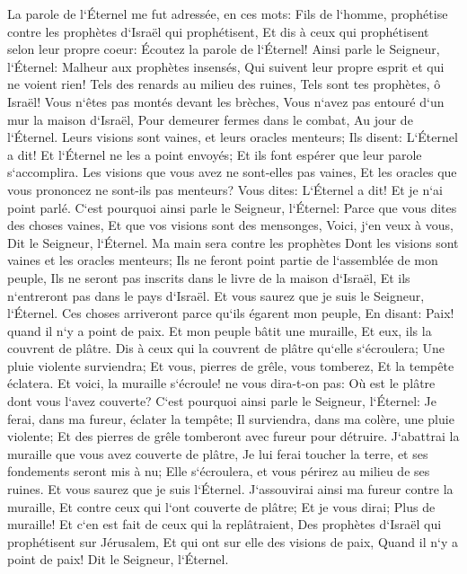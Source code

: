 \verse La parole de l`Éternel me fut adressée, en ces mots: 
\verse Fils de l`homme, prophétise contre les prophètes d`Israël qui prophétisent, Et dis à ceux qui prophétisent selon leur propre coeur: Écoutez la parole de l`Éternel! 
\verse Ainsi parle le Seigneur, l`Éternel: Malheur aux prophètes insensés, Qui suivent leur propre esprit et qui ne voient rien! 
\verse Tels des renards au milieu des ruines, Tels sont tes prophètes, ô Israël! 
\verse Vous n`êtes pas montés devant les brèches, Vous n`avez pas entouré d`un mur la maison d`Israël, Pour demeurer fermes dans le combat, Au jour de l`Éternel. 
\verse Leurs visions sont vaines, et leurs oracles menteurs; Ils disent: L`Éternel a dit! Et l`Éternel ne les a point envoyés; Et ils font espérer que leur parole s`accomplira. 
\verse Les visions que vous avez ne sont-elles pas vaines, Et les oracles que vous prononcez ne sont-ils pas menteurs? Vous dites: L`Éternel a dit! Et je n`ai point parlé. 
\verse C`est pourquoi ainsi parle le Seigneur, l`Éternel: Parce que vous dites des choses vaines, Et que vos visions sont des mensonges, Voici, j`en veux à vous, Dit le Seigneur, l`Éternel. 
\verse Ma main sera contre les prophètes Dont les visions sont vaines et les oracles menteurs; Ils ne feront point partie de l`assemblée de mon peuple, Ils ne seront pas inscrits dans le livre de la maison d`Israël, Et ils n`entreront pas dans le pays d`Israël. Et vous saurez que je suis le Seigneur, l`Éternel. 
\verse Ces choses arriveront parce qu`ils égarent mon peuple, En disant: Paix! quand il n`y a point de paix. Et mon peuple bâtit une muraille, Et eux, ils la couvrent de plâtre. 
\verse Dis à ceux qui la couvrent de plâtre qu`elle s`écroulera; Une pluie violente surviendra; Et vous, pierres de grêle, vous tomberez, Et la tempête éclatera. 
\verse Et voici, la muraille s`écroule! ne vous dira-t-on pas: Où est le plâtre dont vous l`avez couverte? 
\verse C`est pourquoi ainsi parle le Seigneur, l`Éternel: Je ferai, dans ma fureur, éclater la tempête; Il surviendra, dans ma colère, une pluie violente; Et des pierres de grêle tomberont avec fureur pour détruire. 
\verse J`abattrai la muraille que vous avez couverte de plâtre, Je lui ferai toucher la terre, et ses fondements seront mis à nu; Elle s`écroulera, et vous périrez au milieu de ses ruines. Et vous saurez que je suis l`Éternel. 
\verse J`assouvirai ainsi ma fureur contre la muraille, Et contre ceux qui l`ont couverte de plâtre; Et je vous dirai; Plus de muraille! Et c`en est fait de ceux qui la replâtraient, 
\verse Des prophètes d`Israël qui prophétisent sur Jérusalem, Et qui ont sur elle des visions de paix, Quand il n`y a point de paix! Dit le Seigneur, l`Éternel. 
